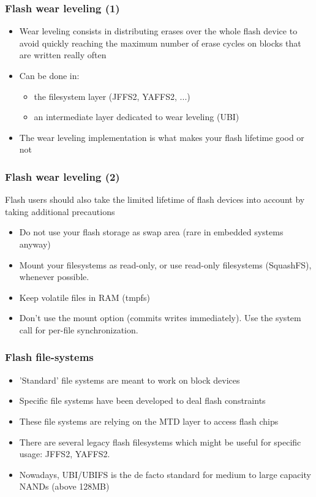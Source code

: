 \begin{frame}
  \frametitle{Flash wear leveling (1)}
  \begin{itemize}
  \item Wear leveling consists in distributing erases over the whole
    flash device to avoid quickly reaching the maximum number of erase
    cycles on blocks that are written really often
  \item Can be done in:
    \begin{itemize}
    \item the filesystem layer (JFFS2, YAFFS2, ...)
    \item an intermediate layer dedicated to wear leveling (UBI)
    \end{itemize}
  \item The wear leveling implementation is what makes your flash
    lifetime good or not
  \end{itemize}
\end{frame}

\begin{frame}
  \frametitle{Flash wear leveling (2)}
  Flash users should also take the limited lifetime of flash
  devices into account by taking additional precautions
  \begin{itemize}
  \item Do not use your flash storage as swap area (rare in embedded
    systems anyway)
  \item Mount your filesystems as read-only, or use read-only
    filesystems (SquashFS), whenever possible.
  \item Keep volatile files in RAM (tmpfs)
  \item Don't use the  mount option (commits writes
    immediately). Use the  system call for per-file
    synchronization.
  \end{itemize}
\end{frame}

\begin{frame}
  \frametitle{Flash file-systems}
  \begin{itemize}
  \item 'Standard' file systems are meant to work on block devices
  \item Specific file systems have been developed to deal flash
    constraints
  \item These file systems are relying on the MTD layer to access
    flash chips
  \item There are several legacy flash filesystems which might be
    useful for specific usage: JFFS2, YAFFS2.
  \item Nowadays, UBI/UBIFS is the de facto standard for medium to
    large capacity NANDs (above 128MB)
  \end{itemize}
\end{frame}

